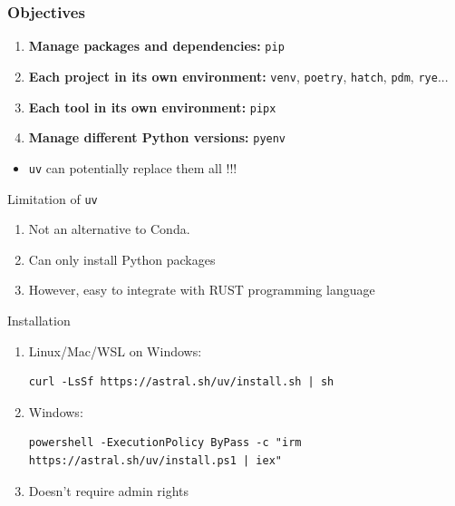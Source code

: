 \documentclass[aspectratio=169,xcolor=dvipsnames,svgnames,x11names,fleqn]{beamer}
\begin{document}
\begin{frame}
    \frametitle{Objectives}
    \begin{enumerate}
        \item \textbf{Manage packages and dependencies:} \texttt{pip}
        \item \textbf{Each project in its own environment:} \texttt{venv}, \texttt{poetry}, \texttt{hatch}, \texttt{pdm}, \texttt{rye}...
        \item \textbf{Each tool in its own environment:} \texttt{pipx}
        \item \textbf{Manage different Python versions:} \texttt{pyenv}
    \end{enumerate}

    \begin{tblock}{}
        \begin{itemize}
        \item \texttt{uv} can potentially replace them all !!!
    \end{itemize}
    \end{tblock}

\end{frame}

\begin{frame}{Limitation of \texttt{uv}}

    \begin{enumerate}
        \item Not an alternative to Conda.
        \item Can only install Python packages
        \item However, easy to integrate with RUST programming language
    \end{enumerate}
    
\end{frame}


\begin{frame}[containsverbatim]{Installation}

    \begin{enumerate}
        \item Linux/Mac/WSL on Windows:
        \begin{verbatim}
curl -LsSf https://astral.sh/uv/install.sh | sh
\end{verbatim}

\item Windows:
\begin{verbatim}
powershell -ExecutionPolicy ByPass -c "irm https://astral.sh/uv/install.ps1 | iex"
\end{verbatim}
\item Doesn't require admin rights
    \end{enumerate}
\end{frame}
\end{document}
